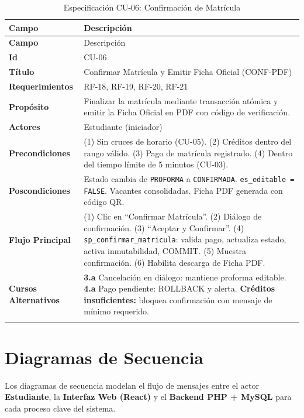 \documentclass[12pt,a4paper]{article}
\begin{document}
\begin{longtable}{>{\bfseries\small}p{3.5cm}>{\small}p{11cm}}
  \toprule
  Campo & Descripci\'on \\
  \midrule
  \endfirsthead
  \midrule Campo & Descripci\'on \\ \midrule \endhead
  Id & CU-06 \\
  T\'itulo & Confirmar Matr\'icula y Emitir Ficha Oficial (CONF-PDF) \\
  Requerimientos & RF-18, RF-19, RF-20, RF-21 \\
  Prop\'osito & Finalizar la matr\'icula mediante transacci\'on at\'omica y emitir la Ficha Oficial en PDF con c\'odigo de verificaci\'on. \\
  Actores & Estudiante (iniciador) \\
  Precondiciones & (1) Sin cruces de horario (CU-05). (2) Cr\'editos dentro del rango v\'alido. (3) Pago de matr\'icula registrado. (4) Dentro del tiempo l\'imite de 5 minutos (CU-03). \\
  Poscondiciones & Estado cambia de \texttt{PROFORMA} a \texttt{CONFIRMADA}. \texttt{es\_editable = FALSE}. Vacantes consolidadas. Ficha PDF generada con c\'odigo QR. \\
  Flujo Principal & (1) Clic en ``Confirmar Matr\'icula''. (2) Di\'alogo de confirmaci\'on. (3) ``Aceptar y Confirmar''. (4) \texttt{sp\_confirmar\_matricula}: valida pago, actualiza estado, activa inmutabilidad, COMMIT. (5) Muestra confirmaci\'on. (6) Habilita descarga de Ficha PDF. \\
  Cursos Alternativos & \textbf{3.a} Cancelaci\'on en di\'alogo: mantiene proforma editable. \textbf{4.a} Pago pendiente: ROLLBACK y alerta. \textbf{Cr\'editos insuficientes:} bloquea confirmaci\'on con mensaje de m\'inimo requerido. \\
  \bottomrule
  \caption{Especificaci\'on CU-06: Confirmaci\'on de Matr\'icula}
\end{longtable}

\newpage

\section{Diagramas de Secuencia}

Los diagramas de secuencia modelan el flujo de mensajes entre el actor \textbf{Estudiante}, la \textbf{Interfaz Web (React)} y el \textbf{Backend PHP + MySQL} para cada proceso clave del sistema.
\end{document}
